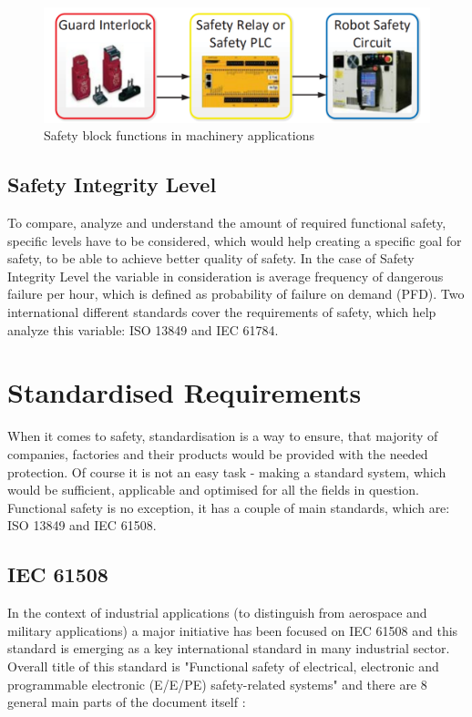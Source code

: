 \documentclass[conference]{IEEEtran}
\begin{document}
\begin{figure}[htbp]
\centerline{\includegraphics[scale=.4]{Machinery_FuSa.png}}
\caption{Safety block functions in machinery applications \cite{robinson_living_2019}}
\label{Interlock}
\end{figure}

\subsection{Safety Integrity Level}

To compare, analyze and understand the amount of required functional safety, specific levels have to be considered, which would help creating a specific goal for safety, to be able to achieve better quality of safety. In the case of Safety Integrity Level the variable in consideration is average frequency of dangerous failure per hour, which is defined as probability of failure on demand (PFD). Two international different standards cover the requirements of safety, which help analyze this variable: ISO 13849 and IEC 61784.

\section{Standardised Requirements}

When it comes to safety, standardisation is a way to ensure, that majority of companies, factories and their products would be provided with the needed protection. Of course it is not an easy task - making a standard system, which would be sufficient, applicable and optimised for all the fields in question. Functional safety is no exception, it has a couple of main standards, which are: ISO 13849 and IEC 61508.

\subsection{IEC 61508}

In the context of industrial applications (to distinguish from aerospace and military applications) a major initiative has been focused on IEC 61508 and this standard is
emerging as a key international standard in many industrial sector. Overall title of this standard is "Functional safety of electrical, electronic and programmable electronic (E/E/PE) safety-related systems" and there are 8 general main parts of the document itself \cite{bell_introduction_nodate}:
\end{document}
